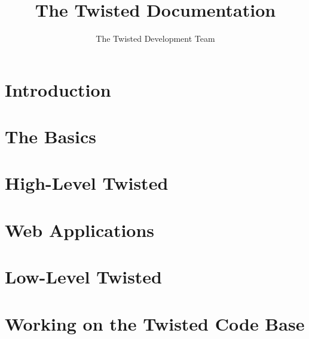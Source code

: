 \documentclass[oneside]{book}
\title{The Twisted Documentation}
\author{The Twisted Development Team}
\begin{document}
\maketitle
\tableofcontents

\chapter{Introduction}











\chapter{The Basics}









\chapter{High-Level Twisted}












\chapter{Web Applications }








\chapter{Low-Level Twisted }










\chapter{Working on the Twisted Code Base}
\end{document}
